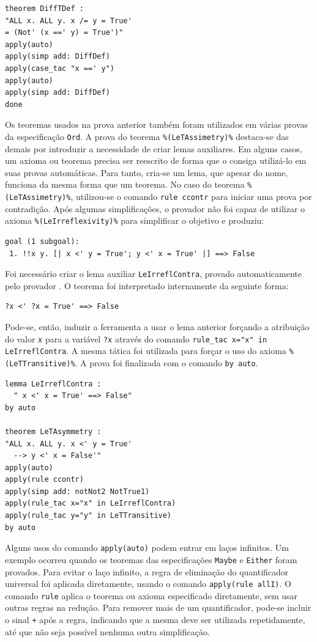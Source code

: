 \begin{Verbatim}
theorem DiffTDef :
"ALL x. ALL y. x /= y = True' 
= (Not' (x ==' y) = True')"
apply(auto)
apply(simp add: DiffDef)
apply(case_tac "x ==' y")
apply(auto)
apply(simp add: DiffDef)
done
\end{Verbatim}

Os teoremas usados na prova anterior também foram utilizados em várias provas da especificação \Verb.Ord..
A prova do teorema \Verb.%(LeTAssimetry)%. destaca-se das demais por introduzir a necessidade de criar lemas auxiliares.
Em alguns casos, um axioma ou teorema precisa ser reescrito de forma que o \Isabelle consiga utilizá-lo em suas provas automáticas.
Para tanto, cria-se um lema, que apesar do nome, funciona da mesma forma que um teorema.
No caso do teorema \Verb.%(LeTAssimetry)%., utilizou-se o comando \Verb.rule ccontr. para iniciar uma prova por contradição.
Após algumas simplificações, o provador \Isabelle não foi capaz de utilizar o axioma \Verb.%(LeIrreflexivity)%. para simplificar o objetivo e produziu:

\begin{Verbatim}
goal (1 subgoal):
 1. !!x y. [| x <' y = True'; y <' x = True' |] ==> False
\end{Verbatim}

Foi necessário criar o lema auxiliar \Verb.LeIrreflContra., provado automaticamente pelo provador \Isabelle.
O teorema foi interpretado internamente da seguinte forma:

\begin{Verbatim}
?x <' ?x = True' ==> False
\end{Verbatim}

Pode-se, então, induzir a ferramenta \Isabelle a usar o lema anterior forçando a atribuição do valor \Verb.x. para a variável \Verb.?x. através do comando \Verb.rule_tac x="x" in LeIrreflContra..
A mesma tática foi utilizada para forçar o uso do axioma \Verb.%(LeTTransitive)%..
A prova foi finalizada com o comando \Verb.by auto..

\begin{Verbatim}
lemma LeIrreflContra :
  " x <' x = True' ==> False"
by auto

theorem LeTAsymmetry :
"ALL x. ALL y. x <' y = True'
  --> y <' x = False'"
apply(auto)
apply(rule ccontr)
apply(simp add: notNot2 NotTrue1)
apply(rule_tac x="x" in LeIrreflContra)
apply(rule_tac y="y" in LeTTransitive)
by auto
\end{Verbatim}

Alguns usos do comando \Verb.apply(auto). podem entrar em laços infinitos.
Um exemplo ocorreu quando os teoremas das especificações \Verb.Maybe. e \Verb.Either. foram provados.
Para evitar o laço infinito, a regra de eliminação do quantificador universal foi aplicada diretamente, usando o comando \Verb.apply(rule allI)..
O comando \Verb.rule. aplica o teorema ou axioma especificado diretamente, sem usar outras regras na redução.
Para remover mais de um quantificador, pode-se incluir o sinal \Verb.+. após a regra, indicando que a mesma deve ser utilizada repetidamente, até que não seja possível nenhuma outra simplificação.

